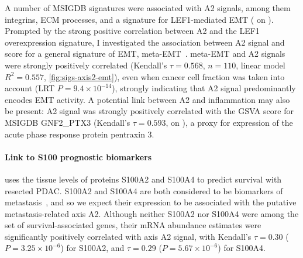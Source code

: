 \documentclass[dissertation.tex]{subfiles}
\begin{document}
A number of \gls{MSIGDB} signatures were associated with A2 signals, among them integrins, \gls{ECM} processes, and a signature for LEF1-mediated \gls{EMT} ( on ).  Prompted by the strong positive correlation between A2 and the LEF1 overexpression signature, I investigated the association between A2 signal and score for a general signature of \gls{EMT}, meta-EMT~\cite{Groger2012}.  meta-EMT and A2 signals were strongly positively correlated (Kendall's $\tau = 0.568$, $n = 110$, linear model $R^2 = 0.557$, \ref{fig:sigs-axis2-emt}), even when cancer cell fraction was taken into account (LRT $P = 9.4 \times 10^{-14}$), strongly indicating that A2 signal predominantly encodes \gls{EMT} activity.  A potential link between A2 and inflammation may also be present: A2 signal was strongly positively correlated with the \gls{GSVA} score for \gls{MSIGDB} GNF2\_PTX3 (Kendall's $\tau = 0.593$,  on ), a proxy for expression of the acute phase response protein pentraxin 3.

\paragraph{Link to S100 prognostic biomarkers}
 uses the tissue levels of proteins S100A2 and S100A4 to predict survival with resected \gls{PDAC}.  S100A2 and S100A4 are both considered to be biomarkers of metastasis~\cite{Biankin2009, Lee2014, Tsukamoto2013}, and so we expect their expression to be associated with the putative metastasis-related axis A2.  Although neither S100A2 nor S100A4 were among the set of  survival-associated genes, their mRNA abundance estimates were significantly positively correlated with axis A2 signal, with Kendall's $\tau = 0.30$ ($P = 3.25 \times 10^{-6}$) for S100A2, and $\tau = 0.29$ ($P = 5.67 \times 10^{-6}$) for S100A4.
\end{document}
